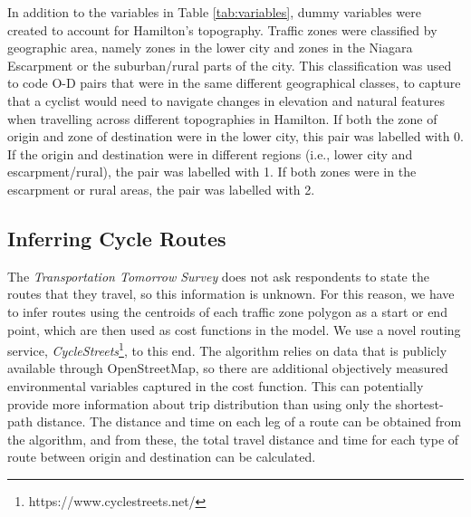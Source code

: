 \documentclass[smallextended]{svjour3}       %
\begin{document}
In addition to the variables in Table \ref{tab:variables}, dummy
variables were created to account for Hamilton's topography. Traffic
zones were classified by geographic area, namely zones in the lower city
and zones in the Niagara Escarpment or the suburban/rural parts of the
city. This classification was used to code O-D pairs that were in the
same different geographical classes, to capture that a cyclist would
need to navigate changes in elevation and natural features when
travelling across different topographies in Hamilton. If both the zone
of origin and zone of destination were in the lower city, this pair was
labelled with 0. If the origin and destination were in different regions
(i.e., lower city and escarpment/rural), the pair was labelled with 1.
If both zones were in the escarpment or rural areas, the pair was
labelled with 2.

\hypertarget{inferring-cycle-routes}{%
\subsection{Inferring Cycle Routes}\label{inferring-cycle-routes}}

The \emph{Transportation Tomorrow Survey} does not ask respondents to
state the routes that they travel, so this information is unknown. For
this reason, we have to infer routes using the centroids of each traffic
zone polygon as a start or end point, which are then used as cost
functions in the model. We use a novel routing service,
\emph{CycleStreets}\footnote{https://www.cyclestreets.net/}, to this
end. The algorithm relies on data that is publicly available through
OpenStreetMap, so there are additional objectively measured
environmental variables captured in the cost function. This can
potentially provide more information about trip distribution than using
only the shortest-path distance. The distance and time on each leg of a
route can be obtained from the algorithm, and from these, the total
travel distance and time for each type of route between origin and
destination can be calculated.
\end{document}
